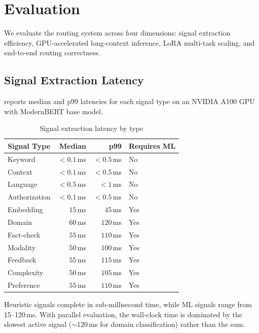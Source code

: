 
\section{Evaluation}
\label{sec:evaluation}

We evaluate the routing system across four dimensions: signal extraction efficiency, GPU-accelerated long-context inference, LoRA multi-task scaling, and end-to-end routing correctness.

\subsection{Signal Extraction Latency}

 reports median and p99 latencies for each signal type on an NVIDIA A100 GPU with ModernBERT base model.

\begin{table}[htbp]
\centering
\caption{Signal extraction latency by type}
\label{tab:signal_latency}
\begin{tabular}{lrrl}
\toprule
\textbf{Signal Type} & \textbf{Median} & \textbf{p99} & \textbf{Requires ML} \\
\midrule
Keyword      & $< 0.1$\,ms & $< 0.5$\,ms  & No \\
Context      & $< 0.1$\,ms & $< 0.5$\,ms  & No \\
Language     & $< 0.5$\,ms & $< 1$\,ms    & No \\
Authorization & $< 0.1$\,ms & $< 0.5$\,ms & No \\
\midrule
Embedding    & $15$\,ms    & $45$\,ms     & Yes \\
Domain       & $60$\,ms    & $120$\,ms    & Yes \\
Fact-check   & $55$\,ms    & $110$\,ms    & Yes \\
Modality     & $50$\,ms    & $100$\,ms    & Yes \\
Feedback     & $55$\,ms    & $115$\,ms    & Yes \\
Complexity   & $50$\,ms    & $105$\,ms    & Yes \\
Preference   & $55$\,ms    & $110$\,ms    & Yes \\
\bottomrule
\end{tabular}
\end{table}

Heuristic signals complete in sub-millisecond time, while ML signals range from 15--120\,ms.
With parallel evaluation, the wall-clock time is dominated by the slowest active signal ($\sim$120\,ms for domain classification) rather than the sum.


